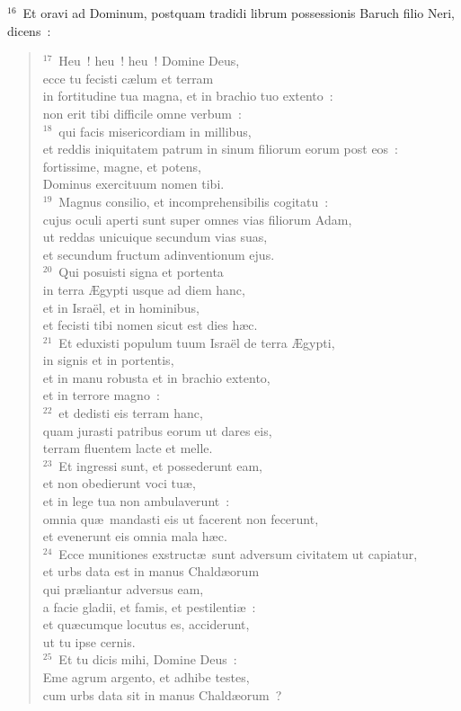 ${}^{16}$~Et oravi ad Dominum, postquam tradidi librum possessionis Baruch filio Neri, dicens~:
\begin{verse}${}^{17}$~Heu~! heu~! heu~! Domine Deus,\\ ecce tu fecisti c\ae lum et terram\\ in fortitudine tua magna, et in brachio tuo extento~:\\ non erit tibi difficile omne verbum~:\\
${}^{18}$~qui facis misericordiam in millibus,\\ et reddis iniquitatem patrum in sinum filiorum eorum post eos~:\\ fortissime, magne, et potens,\\ Dominus exercituum nomen tibi.\\
${}^{19}$~Magnus consilio, et incomprehensibilis cogitatu~:\\ cujus oculi aperti sunt super omnes vias filiorum Adam,\\ ut reddas unicuique secundum vias suas,\\ et secundum fructum adinventionum ejus.\\
${}^{20}$~Qui posuisti signa et portenta\\ in terra \AE gypti usque ad diem hanc,\\ et in Isra\"el, et in hominibus,\\ et fecisti tibi nomen sicut est dies h\ae c.\\
${}^{21}$~Et eduxisti populum tuum Isra\"el de terra \AE gypti,\\ in signis et in portentis,\\ et in manu robusta et in brachio extento,\\ et in terrore magno~:\\
${}^{22}$~et dedisti eis terram hanc,\\ quam jurasti patribus eorum ut dares eis,\\ terram fluentem lacte et melle.\\
${}^{23}$~Et ingressi sunt, et possederunt eam,\\ et non obedierunt voci tu\ae ,\\ et in lege tua non ambulaverunt~:\\ omnia qu\ae\ mandasti eis ut facerent non fecerunt,\\ et evenerunt eis omnia mala h\ae c.\\
${}^{24}$~Ecce munitiones exstruct\ae\ sunt adversum civitatem ut capiatur,\\ et urbs data est in manus Chald\ae orum\\ qui pr\ae liantur adversus eam,\\ a facie gladii, et famis, et pestilenti\ae~:\\ et qu\ae cumque locutus es, acciderunt,\\ ut tu ipse cernis.\\
${}^{25}$~Et tu dicis mihi, Domine Deus~:\\ Eme agrum argento, et adhibe testes,\\ cum urbs data sit in manus Chald\ae orum~?\end{verse}


